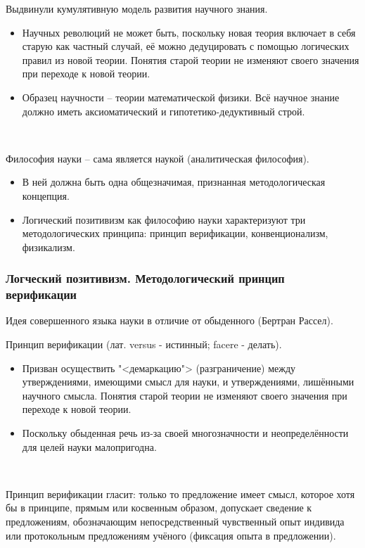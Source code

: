 \documentclass[main.tex]{subfiles}
\begin{document}
{\parindent0pt
Выдвинули кумулятивную модель развития научного знания.
\begin{itemize}[nosep,leftmargin=0.5cm]
\item Научных революций не может быть, поскольку новая теория включает в себя старую как частный случай, её можно дедуцировать с помощью логических правил из новой теории.
Понятия старой теории не изменяют своего значения при переходе к новой теории.
\item Образец научности -- теории математической физики.
Всё научное знание должно иметь аксиоматический и гипотетико-дедуктивный строй.
\end{itemize}
}
\ 

{\parindent0pt
Философия науки -- сама является наукой (аналитическая философия).
\begin{itemize}[nosep,leftmargin=0.5cm]
\item В ней должна быть одна общезначимая, признанная методологическая концепция.
\item Логический позитивизм как философию науки характеризуют три методологических принципа: принцип верификации, конвенционализм, физикализм.
\end{itemize}
}



\subsubsection{Логческий позитивизм. Методологический принцип верификации}


{\parindent0pt
Идея совершенного языка науки в отличие от обыденного (Бертран Рассел).
}
\ \\

{\parindent0pt
Принцип верификации (лат. versus - истинный; facere - делать).
\begin{itemize}[nosep,leftmargin=0.5cm]
\item Призван осуществить "<демаркацию"> (разграничение) между утверждениями, имеющими смысл для науки, и утверждениями, лишёнными научного смысла.
Понятия старой теории не изменяют своего значения при переходе к новой теории.
\item Поскольку обыденная речь из-за своей многозначности и неопределённости для целей науки малопригодна.
\end{itemize}
}
\ 

{\parindent0pt
Принцип верификации гласит: только то предложение имеет смысл, которое хотя бы в принципе, прямым или косвенным образом, допускает сведение к предложениям, обозначающим непосредственный чувственный опыт индивида или протокольным предложениям учёного (фиксация опыта в предложении).
}
\end{document}
